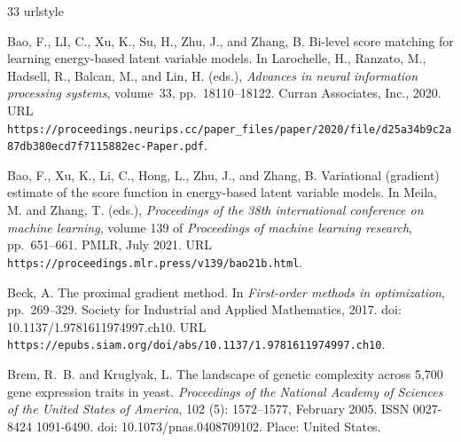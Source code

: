 \documentclass{article} %
\begin{document}


\begin{thebibliography}{33}
\providecommand{\natexlab}[1]{#1}
\providecommand{\url}[1]{\texttt{#1}}
\expandafter\ifx\csname urlstyle\endcsname\relax
  \providecommand{\doi}[1]{doi: #1}\else
  \providecommand{\doi}{doi: \begingroup \urlstyle{rm}\Url}\fi

Bao, F., LI, C., Xu, K., Su, H., Zhu, J., and Zhang, B.
\newblock Bi-level score matching for learning energy-based latent variable models.
\newblock In Larochelle, H., Ranzato, M., Hadsell, R., Balcan, M., and Lin, H. (eds.), \emph{Advances in neural information processing systems}, volume~33, pp.\  18110--18122. Curran Associates, Inc., 2020.
\newblock URL \url{https://proceedings.neurips.cc/paper_files/paper/2020/file/d25a34b9c2a87db380ecd7f7115882ec-Paper.pdf}.

Bao, F., Xu, K., Li, C., Hong, L., Zhu, J., and Zhang, B.
\newblock Variational (gradient) estimate of the score function in energy-based latent variable models.
\newblock In Meila, M. and Zhang, T. (eds.), \emph{Proceedings of the 38th international conference on machine learning}, volume 139 of \emph{Proceedings of machine learning research}, pp.\  651--661. PMLR, July 2021.
\newblock URL \url{https://proceedings.mlr.press/v139/bao21b.html}.

Beck, A.
\newblock The proximal gradient method.
\newblock In \emph{First-order methods in optimization}, pp.\  269--329. Society for Industrial and Applied Mathematics, 2017.
\newblock \doi{10.1137/1.9781611974997.ch10}.
\newblock URL \url{https://epubs.siam.org/doi/abs/10.1137/1.9781611974997.ch10}.

Brem, R.~B. and Kruglyak, L.
\newblock The landscape of genetic complexity across 5,700 gene expression traits in yeast.
\newblock \emph{Proceedings of the National Academy of Sciences of the United States of America}, 102 (5): 1572--1577, February 2005.
\newblock ISSN 0027-8424 1091-6490.
\newblock \doi{10.1073/pnas.0408709102}.
\newblock Place: United States.


\end{thebibliography}
\end{document}
